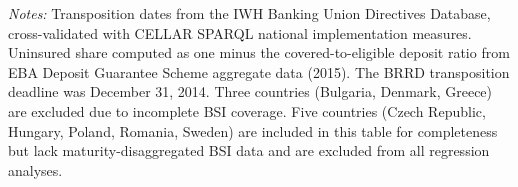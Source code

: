\begin{table}[htbp]
\begin{tablenotes}[flushleft]
\small
\item \textit{Notes:} Transposition dates from the IWH Banking Union Directives Database, cross-validated with CELLAR SPARQL national implementation measures. Uninsured share computed as one minus the covered-to-eligible deposit ratio from EBA Deposit Guarantee Scheme aggregate data (2015). The BRRD transposition deadline was December 31, 2014. Three countries (Bulgaria, Denmark, Greece) are excluded due to incomplete BSI coverage. Five countries (Czech Republic, Hungary, Poland, Romania, Sweden) are included in this table for completeness but lack maturity-disaggregated BSI data and are excluded from all regression analyses.
\end{tablenotes}
\end{table}
